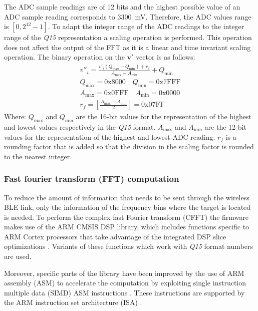 The ADC sample readings are of 12 bits and the highest possible value of an ADC sample reading corresponds to \SI{3300}{\milli\volt}. Therefore, the ADC values range is $[0, 2^{12}-1]$. To adapt the integer range of the ADC readings to the integer range of the \textit{Q15} representation a scaling operation is performed. This operation does not affect the output of the FFT as it is a linear and time invariant scaling operation. The binary operation on the $\mathbf{v'}$ vector is as follows:
\begin{gather}
	v''_i = \frac{v'_i(Q_{\max}-Q_{\min})+r_f}{A_{\max}-A_{\min}} + Q_{\min}\\
	Q_{\max} = \mathrm{0x8000}\quad Q_{\min} = \mathrm{0x7FFF} \\
	A_{\max} = \mathrm{0x0FFF}\quad A_{\min} = \mathrm{0x0000} \\
	r_f = \left\lfloor \frac{A_{\max}-A_{\min}}{2} \right\rfloor = \mathrm{0x07FF}
\end{gather}
Where: $Q_{\max}$ and $Q_{\min}$ are the 16-bit values for the representation of the highest and lowest values respectively in the \textit{Q15} format. $A_{\max}$ and $A_{\min}$ are the 12-bit values for the representation of the highest and lowest ADC reading. $r_f$ is a rounding factor that is added so that the division in the scaling factor is rounded to the nearest integer.

\subsubsection{Fast fourier transform (FFT) computation}

To reduce the amount of information that needs to be sent through the wireless BLE link, only the information of the frequency bins where the target is located is needed. To perform the complex fast Fourier transform (CFFT) the firmware makes use of the ARM CMSIS DSP library, which includes functions specific to ARM Cortex processors that take advantage of the integrated DSP slice optimizations \cite{ARMM4, ARMCMSIS}. Variants of these functions which work with \textit{Q15} format numbers are used.

Moreover, specific parts of the library have been improved by the use of ARM assembly (ASM) to accelerate the computation by exploiting single instruction multiple data (SIMD) ASM instructions \cite{ARMM4}. These instructions are supported by the ARM instruction set architecture (ISA) \cite{ARMM4}.

